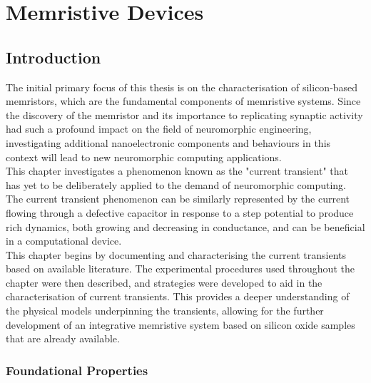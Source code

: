 
\chapter{Memristive Devices}

\section[Introduction]{Introduction}

The initial primary focus of this thesis is on the characterisation of silicon-based memristors, which are the fundamental components of memristive systems. Since the discovery of the memristor and its importance to replicating synaptic activity had such a profound impact on the field of neuromorphic engineering, investigating additional nanoelectronic components and behaviours in this context will lead to new neuromorphic computing applications. \\

\noindent This chapter investigates a phenomenon known as the "current transient" that has yet to be deliberately applied to the demand of neuromorphic computing. The current transient phenomenon can be similarly represented by the current flowing through a defective capacitor in response to a step potential to produce rich dynamics, both growing and decreasing in conductance, and can be beneficial in a computational device. \\

\noindent This chapter begins by documenting and characterising the current transients based on available literature. The experimental procedures used throughout the chapter were then described, and strategies were developed to aid in the characterisation of current transients. This provides a deeper understanding of the physical models underpinning the transients, allowing for the further development of an integrative memristive system based on silicon oxide samples that are already available.

\subsection[Foundational Properties]{Foundational Properties}

